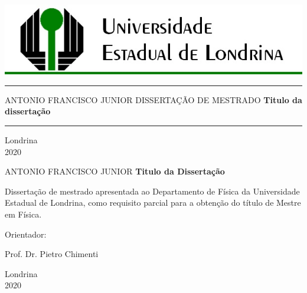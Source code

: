 \documentclass[12pt,a4paper]{report}
\theoremstyle{definition}
\begin{document}
\thispagestyle{empty}
\begin{center}
\includegraphics[width=14.8cm]{UELmoderno.png}
{\color{green!45!black} \rule{\columnwidth}{1.5mm}}
\vspace{.7cm}
{\Large \uppercase{Antonio Francisco Junior }}
\vspace{1.0cm}
{\large \uppercase{ DISSERTAÇÃO  DE MESTRADO }}
\vspace{5.0cm}
\LARGE \textbf{Titulo da dissertação} 
\normalsize
\vspace{6.0cm}
{\color{green!45!black} \rule{\columnwidth}{1.5mm}}
Londrina \\ 2020
\end{center}

\newpage
\thispagestyle{empty}
\begin{center}
{\Large \uppercase{ Antonio Francisco Junior }}
\vspace{6cm}
\Large \textbf{Titulo da Dissertação}       
\normalsize
\vspace{3cm}
\end{center}
\noindent \hspace{7.cm} 
\begin{minipage}{8.5cm}{
\begin{singlespace} 
Dissertação de mestrado apresentada ao Departamento de Física da Universidade Estadual de Londrina, como requisito parcial para a obtenção do título de Mestre em Física.
\end{singlespace}
Orientador: \parbox[t]{6.0cm}{Prof. Dr. Pietro Chimenti}}
\end{minipage}
\vspace{5cm}
\begin{center}
Londrina\\
2020
\end{center}
\end{document}
